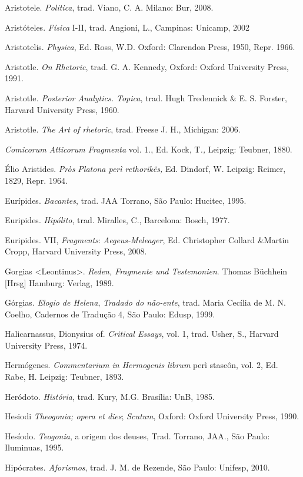 Aristotele. \emph{Politica}, trad. Viano, C. A. Milano: Bur, 2008.

Aristóteles. \emph{Física} I-II, trad. Angioni, L., Campinas: Unicamp,
2002

Aristotelis. \emph{Physica}, Ed. Ross, W.D. Oxford: Clarendon Press,
1950, Repr. 1966.

Aristotle. \emph{On Rhetoric}, trad. G. A. Kennedy, Oxford: Oxford
University Press, 1991.

Aristotle\emph{. Posterior Analytics. Topica}, trad. Hugh Tredennick \&
E. S. Forster, Harvard University Press, 1960.

Aristotle. \emph{The Art of rhetoric}, trad. Freese J. H., Michigan:
2006.

\emph{Comicorum Atticorum Fragmenta} vol. 1., Ed. Kock, T\emph{.,}
Leipzig: Teubner, 1880.

Élio Aristides. \emph{Pròs Platona perì rethorikês,} Ed. Dindorf, W.
Leipzig: Reimer, 1829, Repr. 1964.

Eurípides. \emph{Bacantes}, trad. JAA Torrano, São Paulo: Hucitec, 1995.

Euripides. \emph{Hipólito}, trad. Miralles, C., Barcelona: Bosch, 1977.

Euripides. VII, \emph{Fragments}: \emph{Aegeus-Meleager}, Ed.
Christopher Collard \&Martin Cropp, Harvard University Press, 2008.

Gorgias \textless{}Leontinus\textgreater{}. \emph{Reden, Fragmente und
Testemonien}. Thomas Büchhein {[}Hrsg{]} Hamburg: Verlag, 1989.

Górgias. \emph{Elogio de Helena}, \emph{Tradado do não-ente}, trad.
Maria Cecília de M. N. Coelho, Cadernos de Tradução 4, São Paulo: Edusp,
1999.

Halicarnassus, Dionysius of. \emph{Critical Essays}, vol. 1, trad.
Usher, S., Harvard University Press, 1974.

Hermógenes. \emph{Commentarium in Hermogenis librum} perì staseôn, vol.
2, Ed. Rabe, H. Leipzig: Teubner, 1893.

Heródoto. \emph{História}, trad. Kury, M.G. Brasília: UnB, 1985.

Hesiodi \emph{Theogonia; opera et dies}; \emph{Scutum}, Oxford: Oxford
University Press, 1990.

Hesíodo. \emph{Teogonia}, a origem dos deuses, Trad. Torrano, JAA., São
Paulo: Iluminuas, 1995.

Hipócrates. \emph{Aforismos}, trad. J. M. de Rezende, São Paulo:
Unifesp, 2010.

